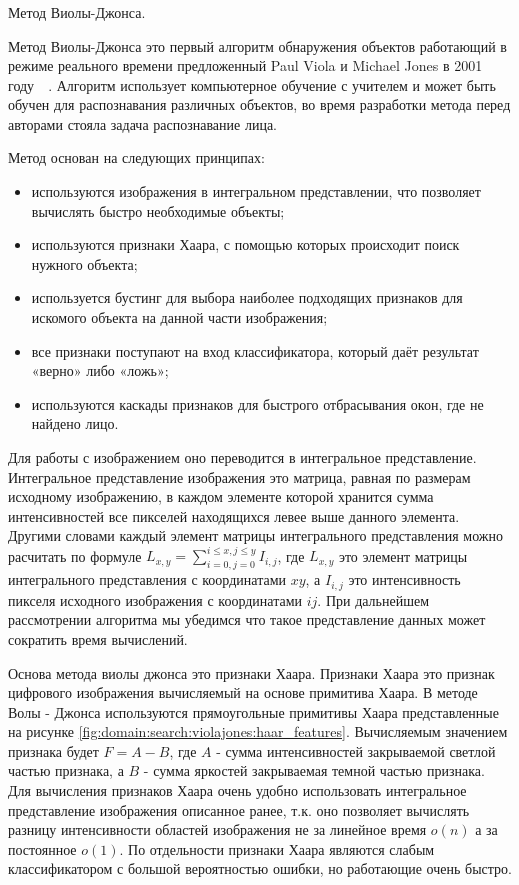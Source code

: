 \subsubsection{}
\label{sub:domain:search:violajones}
Метод Виолы-Джонса.

Метод Виолы-Джонса  это первый алгоритм обнаружения объектов работающий в режиме реального времени предложенный Paul Viola и Michael Jones в 2001 году~\cite{viola_jones_wiki}~\cite{viola_jones_habr}. Алгоритм использует компьютерное обучение с учителем и может быть обучен для распознавания различных объектов, во время разработки метода перед авторами стояла задача распознавание лица. 

Метод основан на следующих принципах:
\begin{itemize}
  \item используются изображения в интегральном представлении, что позволяет вычислять быстро необходимые объекты;
  \item используются признаки Хаара, с помощью которых происходит поиск нужного объекта;
  \item используется бустинг для выбора наиболее подходящих признаков для искомого объекта на данной части изображения;
  \item все признаки поступают на вход классификатора, который даёт результат «верно» либо «ложь»;
  \item используются каскады признаков для быстрого отбрасывания окон, где не найдено лицо.
\end{itemize}

Для работы с изображением оно переводится в интегральное представление. Интегральное представление изображения это матрица, равная по размерам исходному изображению, в каждом элементе которой хранится сумма интенсивностей все пикселей находящихся левее выше данного элемента. Другими словами каждый элемент матрицы интегрального представления можно расчитать по формуле 
$ L_{x,y} = \sum_{i=0,j=0}^{i \leq x, j \leq y} I_{i,j} $, где $L_{x,y}$ это элемент матрицы интегрального представления с координатами $xy$, а $I_{i,j}$ это интенсивность пикселя исходного изображения с координатами $ij$.
При дальнейшем рассмотрении алгоритма мы убедимся что такое представление данных может сократить время вычислений.

Основа метода виолы джонса это признаки Хаара. Признаки Хаара это признак цифрового изображения вычисляемый на основе примитива Хаара. В методе Волы - Джонса используются прямоугольные примитивы Хаара представленные на рисунке \ref{fig:domain:search:violajones:haar_features}. Вычисляемым значением признака будет $F = A - B$, где $A$ - сумма интенсивностей закрываемой светлой частью признака, а $B$ - сумма яркостей закрываемая темной частью признака. Для вычисления признаков Хаара очень удобно использовать интегральное представление изображения описанное ранее, т.к. оно позволяет вычислять разницу интенсивности областей изображения не за линейное время $o(n)$ а за постоянное $o(1)$. По отдельности признаки Хаара являются слабым классификатором с большой вероятностью ошибки, но работающие очень быстро. 

